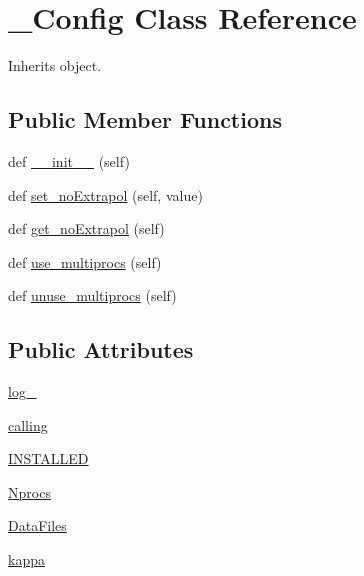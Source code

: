 \hypertarget{classpyneb_1_1utils_1_1_config_1_1___config}{}\section{\+\_\+\+Config Class Reference}
\label{classpyneb_1_1utils_1_1_config_1_1___config}


Inherits object.

\subsection*{Public Member Functions}
\begin{DoxyCompactItemize}
\item 
def \hyperlink{classpyneb_1_1utils_1_1_config_1_1___config_ae64f0875afe3067b97ba370b354b9213}{\+\_\+\+\_\+init\+\_\+\+\_\+} (self)
\item 
def \hyperlink{classpyneb_1_1utils_1_1_config_1_1___config_a3f4a32a346511439c061526ca9ef6d3e}{set\+\_\+no\+Extrapol} (self, value)
\item 
def \hyperlink{classpyneb_1_1utils_1_1_config_1_1___config_ab1f88e757d19b03965760022b9d81a17}{get\+\_\+no\+Extrapol} (self)
\item 
def \hyperlink{classpyneb_1_1utils_1_1_config_1_1___config_a66b920089052d4d39cdef44b5f228781}{use\+\_\+multiprocs} (self)
\item 
def \hyperlink{classpyneb_1_1utils_1_1_config_1_1___config_a28889407e4f3f28f5fb9920f56709780}{unuse\+\_\+multiprocs} (self)
\end{DoxyCompactItemize}
\subsection*{Public Attributes}
\begin{DoxyCompactItemize}
\item 
\hyperlink{classpyneb_1_1utils_1_1_config_1_1___config_afd87151907f32bc0dc45f0171b61374e}{log\+\_\+}
\item 
\hyperlink{classpyneb_1_1utils_1_1_config_1_1___config_ab25fa7ebe84b603684dee62410c1e34c}{calling}
\item 
\hyperlink{classpyneb_1_1utils_1_1_config_1_1___config_a22ccf7c4d0168625234d7deeab717f08}{I\+N\+S\+T\+A\+L\+L\+E\+D}
\item 
\hyperlink{classpyneb_1_1utils_1_1_config_1_1___config_ade05ba3ca67358e003a5068f5c8d0943}{Nprocs}
\item 
\hyperlink{classpyneb_1_1utils_1_1_config_1_1___config_a39a6ddc32b12b3b09096acc6b9761503}{Data\+Files}
\item 
\hyperlink{classpyneb_1_1utils_1_1_config_1_1___config_a05c35019108b510c24383c505ab98b92}{kappa}
\end{DoxyCompactItemize}
